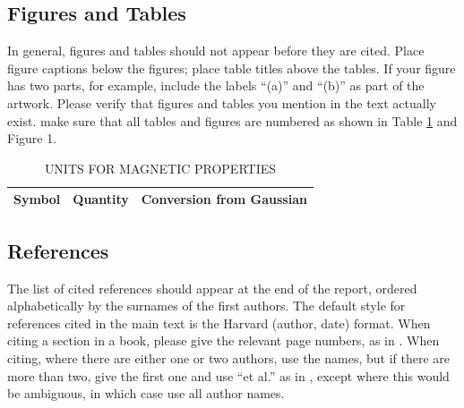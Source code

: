 \documentclass[12pt,a4paper]{article}
\begin{document}




\subsection{Figures and Tables}
In general, figures and tables should not appear before they are cited.  Place figure captions below the figures; place table titles above the tables.  If your figure has two parts, for example, include the labels ``(a)'' and ``(b)'' as part of the artwork.  Please verify that figures and tables you mention in the text actually exist.  make sure that all tables and figures are numbered as shown in Table \ref{units} and Figure 1.

\begin{table}[htb]
\centering
\caption{UNITS FOR MAGNETIC PROPERTIES}
\vspace*{6pt}
\label{units}
\begin{tabular}{ccc}\hline\hline
Symbol & Quantity & Conversion from Gaussian \\ \hline
\end{tabular}
\end{table}


\subsection{References}

The list of cited references should appear at the end of the report, ordered alphabetically by the surnames of the first authors.  The default style for references cited in the main text is the  Harvard (author, date) format.  When citing a section in a book, please give the relevant page numbers, as in \cite[p293]{budgen}.  When citing, where there are either one or two authors, use the names, but if there are more than two, give the first one and use ``et al.'' as in  , except where this would be ambiguous, in which case use all author names.
\end{document}
